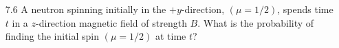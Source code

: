 \begin{enumerate}
\begin{proof}
    we can use $\hat{R}_{x}(-\pi/2)$ as the change-of-basis matrix from
    the $y$-basis to the $z$-basis as
    \begin{equation*}
      \hat{R}_x(-\pi/2) \binom{1}{0} = \frac{1}{\sqrt{2}} \binom{1}{i},
    \end{equation*}
    which, written out, is equivalent to
    \begin{equation*}
      \ket{\mu = 1/2} = \frac{1}{\sqrt{2}} \ket{m = 1/2} + \frac{i}{\sqrt{2}} \ket{m = -1/2}.
    \end{equation*}
  \end{proof}
\item[7.6] A neutron spinning initially in the $+y$-direction, $(\mu = 1/2)$, spends time $t$ in a $z$-direction magnetic field of strength $B$. What is the probability of finding the initial spin $(\mu = 1/2)$ at time $t$?


\end{enumerate}
